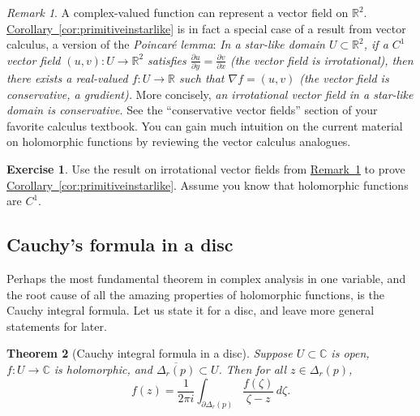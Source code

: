 \documentclass[12pt,openany]{book}
\newcommand{\C}{{\mathbb{C}}}
\newcommand{\R}{{\mathbb{R}}}
\newcommand{\myindex}[1]{#1\index{#1}}
\newcommand{\myquote}[1]{``#1''}
\theoremstyle{plain}
\newtheorem{thm}{Theorem}[section]
\theoremstyle{remark}
\newtheorem{remark}[thm]{Remark}
\theoremstyle{definition}
\newenvironment{exbox}{%
    \def\FrameCommand{\vrule width 1pt \relax\hspace{10pt}}%
    \MakeFramed{\advance\hsize-\width\FrameRestore}%
}{%
    \endMakeFramed
}
\theoremstyle{exercise}
\newtheorem{exercise}{Exercise}[section]
\theoremstyle{example}
\newcommand{\corref}[1]{\hyperref[#1]{Corollary~\ref*{#1}}}
\newcommand{\remarkref}[1]{\hyperref[#1]{Remark~\ref*{#1}}}
\begin{document}
\begin{remark}\label{remark:irrotvfield}
A complex-valued function can represent a vector field on $\R^2$.
\corref{cor:primitiveinstarlike}
is in fact a special case of a result from
vector calculus, a version of the \emph{\myindex{Poincar\'e lemma}}:
\emph{In a star-like domain $U \subset \R^2$, if a
$C^1$ vector field $(u,v) \colon U \to \R^2$
satisfies $\frac{\partial u}{\partial y} = \frac{\partial v}{\partial x}$
(the vector field is \emph{irrotational}),
then there exists a real-valued $f \colon U \to \R$ such that
$\nabla f = (u,v)$ (the vector field is conservative, a gradient).}
More concisely, \emph{an irrotational vector field
in a star-like domain is conservative.}
See the \myquote{conservative vector fields} section
of your favorite calculus textbook.  You can gain much
intuition on the current material on holomorphic functions by reviewing the
vector calculus analogues.
\end{remark}

\begin{exbox}
\begin{exercise}
Use the result on irrotational vector fields from
\remarkref{remark:irrotvfield} to prove 
\corref{cor:primitiveinstarlike}.
Assume you know that holomorphic functions are $C^1$.
\end{exercise}
\end{exbox}

\subsection{Cauchy's formula in a disc}

Perhaps the most fundamental theorem in complex analysis in one variable,
and the root cause of all the amazing properties of holomorphic functions,
is the Cauchy integral formula.  Let us state it for a disc, and leave
more general statements for later.

\begin{thm}[Cauchy integral formula in a disc]
Suppose $U \subset \C$ is open, $f \colon U \to \C$ is holomorphic,
and $\overline{\Delta_r(p)} \subset U$.
Then for all $z \in \Delta_r(p)$,
\begin{equation*}
f(z)
=
\frac{1}{2\pi i}
\int_{\partial \Delta_r(p)}
\frac{f(\zeta)}{\zeta-z}
\,
d \zeta .
\end{equation*}
\end{thm}
\end{document}
